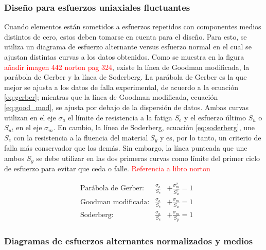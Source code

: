 \subsubsection{Diseño para esfuerzos uniaxiales fluctuantes}
Cuando elementos están sometidos a esfuerzos repetidos con componentes medios distintos de cero, estos deben tomarse en cuenta para el diseño. Para esto, se utiliza un diagrama de esfuerzo alternante versus esfuerzo normal en el cual se ajustan distintas curvas a los datos obtenidos. Como se muestra en la figura \textcolor{red}{añadir imagen 442 norton pag 324}, existe la línea de Goodman modificada, la parábola de Gerber y la línea de Soderberg. La parábola de Gerber es la que mejor se ajusta a los datos de falla experimental, de acuerdo a la ecuación \ref{eq:gerber}; mientras que la línea de Goodman modificada, ecuación \ref{eq:good_mod}, se ajusta por debajo de la dispersión de datos. Ambas curvas utilizan en el eje $\sigma_a$ el límite de resistencia a la fatiga $S_e$ y el esfuerzo último $S_u$ o $S_{ut}$ en el eje $\sigma_m$. En cambio, la línea de Soderberg, ecuación \ref{eq:soderberg}, une $S_e$ con la resistencia a la fluencia del material $S_y$ y es, por lo tanto, un criterio de falla más conservador que los demás. Sin embargo, la línea punteada que une ambos $S_y$ se debe utilizar en las dos primeras curvas como límite del primer ciclo de esfuerzo para evitar que ceda o falle. \textcolor{red}{Referencia a libro norton}

\begin{centering}
\begin{align}
&\text{Parábola de Gerber:}&	\frac{\sigma_a}{S_e} &+ \frac{\sigma_m^2}{S_u^2} = 1 \label{eq:gerber}\\
&\text{Goodman modificada:}&	\frac{\sigma_a}{S_e} &+ \frac{\sigma_m}{S_u} = 1 \label{eq:good_mod}\\
&\text{Soderberg:}&	\frac{\sigma_a}{S_e} &+ \frac{\sigma_m}{S_y} = 1 \label{eq:soderberg}
\end{align}
\end{centering}


\subsubsection{Diagramas de esfuerzos alternantes normalizados y medios}

